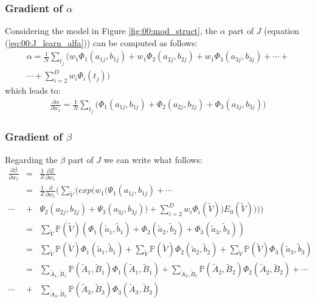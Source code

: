 \subsubsection{Gradient of $\alpha$}

Considering the model in Figure \ref{fig:00:mod_struct}, the $\alpha$ part of $J$ (equation (\ref{eq:00:J_learn_alfa})) can be computed as follows:
\begin{eqnarray}
\alpha = \frac{1}{N}\sum_{t_j} \big(  w_1 \Phi_1(a_{1j}, b_{1j}) +
w_1 \Phi_2(a_{2j}, b_{2j}) +
w_1 \Phi_3(a_{3j}, b_{3j}) + \cdots + \nonumber\\
\cdots + \sum_{i=2}^{D} w_i \Phi_{i}(t_j) \big)
\end{eqnarray}
which leads to:
\begin{eqnarray}
\frac{\partial \alpha}{\partial w_1} = \frac{1}{N}\sum_{t_j} \big(  \Phi_1(a_{1j}, b_{1j}) +
\Phi_2(a_{2j}, b_{2j}) +
\Phi_3(a_{3j}, b_{3j}) \big)
\end{eqnarray}

\subsubsection{Gradient of $\beta$}

Regarding the $\beta$ part of $J$ we can write what follows:
\begin{eqnarray}
\frac{\partial \beta}{\partial w_1} &=& \frac{1}{Z}\frac{\partial Z}{\partial w_1} \nonumber\\
&=&  \frac{1}{Z} \frac{\partial}{\partial w_1} \big( 
\sum_{\tilde{V}} \bigg( exp\big( w_1( 
\Psi_1(a_{1j}, b_{1j}) + \cdots \nonumber\\
\cdots &+&
\Psi_2(a_{2j}, b_{2j}) +
\Psi_3(a_{3j}, b_{3j})
)  + \sum_{i=2}^{D} w_i \Phi _i(\tilde{V}) \big) E_0(\tilde{V})) \big)
 \bigg) \nonumber\\
&=& \sum_{\tilde{V}} \mathbb{P}(\tilde{V})(
\Phi_1(\tilde{a}_1, \tilde{b}_1) + 
\Phi_2(\tilde{a}_2, \tilde{b}_2) + 
\Phi_3(\tilde{a}_3, \tilde{b}_3)
) \nonumber\\
&=& \sum_{\tilde{V}} \mathbb{P}(\tilde{V})\Phi_1(\tilde{a}_1, \tilde{b}_1) +
\sum_{\tilde{V}} \mathbb{P}(\tilde{V})\Phi_2(\tilde{a}_2, \tilde{b}_2) +
\sum_{\tilde{V}} \mathbb{P}(\tilde{V})\Phi_3(\tilde{a}_3, \tilde{b}_3) \nonumber\\
&=& \sum_{\tilde{A}_1, \tilde{B}_1} \mathbb{P}(\tilde{A}_1, \tilde{B}_1) \Phi_1(\tilde{A}_1, \tilde{B}_1) +
\sum_{\tilde{A}_2, \tilde{B}_2} \mathbb{P}(\tilde{A}_2, \tilde{B}_2) \Phi_2(\tilde{A}_2, \tilde{B}_2) + \cdots \nonumber\\
\cdots &+&
\sum_{\tilde{A}_3, \tilde{B}_3} \mathbb{P}(\tilde{A}_3, \tilde{B}_3) \Phi_3(\tilde{A}_3, \tilde{B}_3) 
\end{eqnarray}


